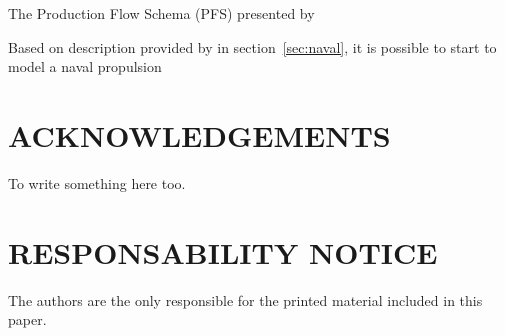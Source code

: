 \documentclass[10pt,fleqn,a4paper,twoside]{article}
\begin{document}
The Production Flow Schema (PFS) presented by \citet{Miyagi1996}\

Based on description provided by in section~\ref{sec:naval}\space, it is possible to start to model a naval propulsion

\section{ACKNOWLEDGEMENTS}
\label{sec:ack}

To write something here too.


\renewcommand{\refname}{}


\section{RESPONSABILITY NOTICE}

The authors are the only responsible for the printed material included in this paper.
\end{document}
